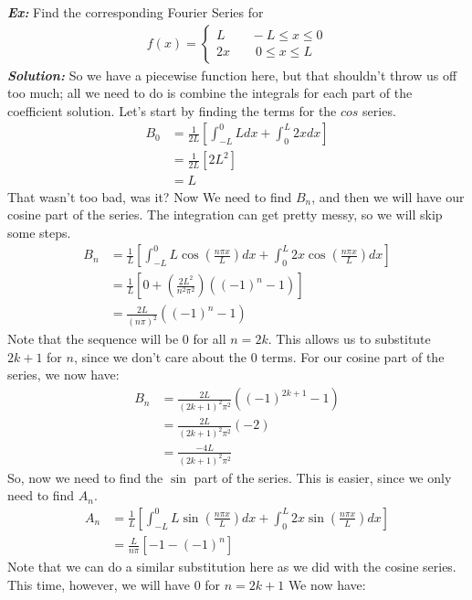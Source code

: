 \documentclass{article}
\begin{document}
\textbf{\textit{Ex:}} Find the corresponding Fourier Series for
\begin{gather*}
f(x)=
\begin{cases*}
L \qquad -L \leq x \leq 0\\
2x \qquad 0 \leq x \leq L
\end{cases*}
\end{gather*}
\indent \textbf{\textit{Solution:}} So we have a piecewise function here, but that shouldn't throw us off too much; all we need to do is combine the integrals for each part of the coefficient solution. Let's start by finding the terms for the $cos$ series.
\begin{align*}
B_{0} &= \frac{1}{2L}\left[\int_{-L}^{0}Ldx + \int_{0}^{L}2xdx\right]\\
&= \frac{1}{2L}[2L^{2}]\\
&= L
\end{align*}
\noindent That wasn't too bad, was it? Now We need to find $B_{n}$, and then we will have our cosine part of the series. The integration can get pretty messy, so we will skip some steps.
\begin{align*}
B_{n} &= \frac{1}{L}\left[\int_{-L}^{0}L\cos{\left(\frac{n\pi x}{L}\right)}dx + \int_{0}^{L}2x\cos{\left(\frac{n\pi x}{L}\right)}dx\right]\\
&= \frac{1}{L}\left[0 + \left(\frac{2L^{2}}{n^{2}\pi^{2}}\right)((-1)^{n} - 1)\right]\\
&= \frac{2L}{(n\pi)^{2}}((-1)^{n} - 1)
\end{align*}
\noindent Note that the sequence will be 0 for all $n = 2k$. This allows us to substitute $2k+1$ for $n$, since we don't care about the $0$ terms. For our cosine part of the series, we now have:
\begin{align*}
B_{n} &= \frac{2L}{(2k+1)^{2}\pi^{2}}((-1)^{2k+1}-1)\\
&= \frac{2L}{(2k+1)^{2}\pi^{2}}(-2)\\
&= \frac{-4L}{(2k+1)^{2}\pi^{2}}
\end{align*}
\noindent So, now we need to find the $\sin$ part of the series. This is easier, since we only need to find $A_{n}$.
\begin{align*}
A_{n} &= \frac{1}{L}\left[\int_{-L}^{0}L\sin{\left(\frac{n\pi x}{L}\right)}dx + \int_{0}^{L}2x\sin{\left(\frac{n\pi x}{L}\right)}dx \right]\\
&= \frac{L}{n\pi}\left[-1-(-1)^{n}\right]
\end{align*}
\noindent Note that we can do a similar substitution here as we did with the cosine series. This time, however, we will have $0$ for $n = 2k+1$ We now have:
\end{document}
